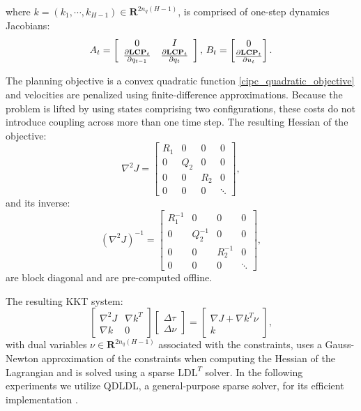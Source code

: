 where $k = (k_1, \cdots, k_{H-1}) \in \mathbf{R}^{2n_q(H-1)}$, is comprised of one-step dynamics Jacobians:
\begin{equation}
	A_t = \left[\begin{array}{c c} 0 & I \\ \frac{\partial \textbf{LCP}_t}{\partial q_{t-1}} & \frac{\partial \textbf{LCP}_t}{\partial q_{t}} \end{array} \right],\, B_t = \begin{bmatrix} 0 \\ \frac{\partial \textbf{LCP}_t}{\partial u_t} \end{bmatrix}.
\end{equation}

The planning objective is a convex quadratic function \eqref{cipc_quadratic_objective} and velocities are penalized using finite-difference approximations. Because the problem is lifted by using states comprising two configurations, these costs do not introduce coupling across more than one time step. The resulting Hessian of the objective:
\begin{equation}
	\nabla^2 J = \begin{bmatrix} R_1 & 0 & 0 & 0 \\ 0 & Q_2 & 0 & 0 \\ 0 & 0 & R_2 & 0 \\ 0 & 0 & 0 & \ddots \end{bmatrix},
\end{equation}
and its inverse:
\begin{equation}
	(\nabla^2 J)^{-1} = \begin{bmatrix} R^{-1}_1 & 0 & 0 & 0 \\ 0 & Q^{-1}_2 & 0 & 0 \\ 0 & 0 & R^{-1}_2 & 0 \\ 0 & 0 & 0 & \ddots \end{bmatrix},
\end{equation}
are block diagonal and are pre-computed offline.

The resulting KKT system:
\begin{equation}
	\begin{bmatrix} \nabla^2 J & \nabla k^T \\ \nabla k & 0 \end{bmatrix} \begin{bmatrix} \Delta \tau \\ \Delta \nu \end{bmatrix} = \begin{bmatrix} \nabla J + \nabla k^T \nu \\ k \end{bmatrix}, \label{cipc_trajopt_kkt}
\end{equation}
with dual variables $\nu \in \mathbf{R}^{2 n_q (H-1)}$ associated with the constraints, uses a Gauss-Newton approximation of the constraints when computing the Hessian of the Lagrangian and is solved using a sparse $\mbox{LDL}^T$ solver. In the following experiments we utilize QDLDL, a general-purpose sparse solver, for its efficient implementation \cite{davis2005algorithm}.

